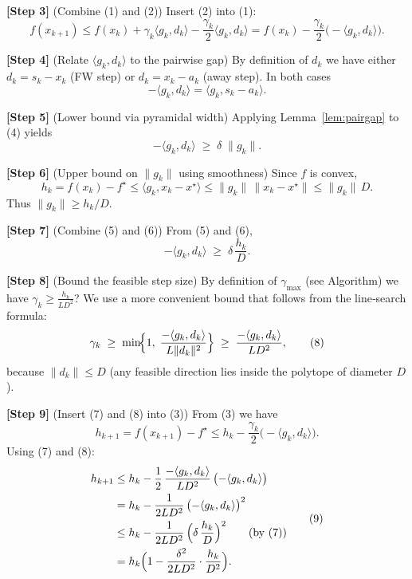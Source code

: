 \documentclass{article}
\begin{document}
\noindent\textbf{[Step 3]} (Combine (1) and (2))  
Insert (2) into (1):
\[
f(x_{k+1})\le f(x_{k})+\gamma_{k}\langle g_{k},d_{k}\rangle
            -\frac{\gamma_{k}}{2}\langle g_{k},d_{k}\rangle
        = f(x_{k})-\frac{\gamma_{k}}{2}\bigl(-\langle g_{k},d_{k}\rangle\bigr). \tag{3}
\]

\noindent\textbf{[Step 4]} (Relate $\langle g_{k},d_{k}\rangle$ to the pairwise gap)  
By definition of $d_{k}$ we have either $d_{k}=s_{k}-x_{k}$ (FW step) or $d_{k}=x_{k}-a_{k}$ (away step). In both cases
\[
-\langle g_{k},d_{k}\rangle
= \langle g_{k},s_{k}-a_{k}\rangle . \tag{4}
\]

\noindent\textbf{[Step 5]} (Lower bound via pyramidal width)  
Applying Lemma~\ref{lem:pairgap} to (4) yields
\[
-\langle g_{k},d_{k}\rangle
\;\ge\; \delta\;\|g_{k}\| . \tag{5}
\]

\noindent\textbf{[Step 6]} (Upper bound on $\|g_{k}\|$ using smoothness)  
Since $f$ is convex,
\[
h_{k}=f(x_{k})-f^{\star}\le\langle g_{k},x_{k}-x^{\star}\rangle
      \le\|g_{k}\|\,\|x_{k}-x^{\star}\|
      \le\|g_{k}\|\,D . \tag{6}
\]
Thus $\|g_{k}\|\ge h_{k}/D$.

\noindent\textbf{[Step 7]} (Combine (5) and (6))  
From (5) and (6),
\[
-\langle g_{k},d_{k}\rangle\;\ge\;\delta\,\frac{h_{k}}{D}. \tag{7}
\]

\noindent\textbf{[Step 8]} (Bound the feasible step size)  
By definition of $\gamma_{\max}$ (see Algorithm) we have $\gamma_{k}\ge \frac{h_{k}}{L D^{2}}$?  
We use a more convenient bound that follows from the line‑search formula:
\[
\gamma_{k}\;\ge\;\min\!\Bigl\{1,\;\frac{-\langle g_{k},d_{k}\rangle}{L\|d_{k}\|^{2}}\Bigr\}
      \;\ge\;\frac{-\langle g_{k},d_{k}\rangle}{L D^{2}} , \tag{8}
\]
because $\|d_{k}\|\le D$ (any feasible direction lies inside the polytope of diameter $D$).

\noindent\textbf{[Step 9]} (Insert (7) and (8) into (3))  
From (3) we have
\[
h_{k+1}=f(x_{k+1})-f^{\star}
\le h_{k}-\frac{\gamma_{k}}{2}\bigl(-\langle g_{k},d_{k}\rangle\bigr).
\]
Using (7) and (8):
\[
\begin{aligned}
h_{k+1}
&\le h_{k}-\frac{1}{2}\,
      \frac{-\langle g_{k},d_{k}\rangle}{L D^{2}}\,
      \bigl(-\langle g_{k},d_{k}\rangle\bigr)   \\
&= h_{k}-\frac{1}{2L D^{2}}\,
      \bigl(-\langle g_{k},d_{k}\rangle\bigr)^{2}   \\
&\le h_{k}-\frac{1}{2L D^{2}}\,
      \Bigl(\delta\,\frac{h_{k}}{D}\Bigr)^{2}
   \qquad\text{(by (7))}                           \\
&= h_{k}\Bigl(1-\frac{\delta^{2}}{2L D^{2}}\cdot\frac{h_{k}}{D^{2}}\Bigr).
\end{aligned} \tag{9}
\]
\end{document}
